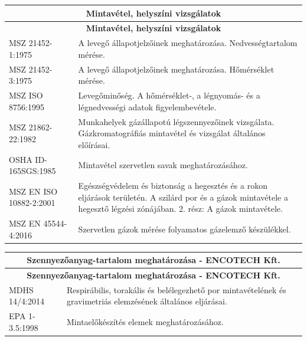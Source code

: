 \documentclass[a4paper,12pt]{article}
\renewcommand{\arraystretch}{0.5}
\begin{document}
		\renewcommand{\arraystretch}{1.1} %
		\footnotesize %

		\begin{longtable}{|p{5cm}|p{10cm}|}
			\hline
			\multicolumn{2}{|c|}{\textbf{Mintavétel, helyszíni vizsgálatok}} \\
			\hline
			\endfirsthead

			\multicolumn{2}{|c|}{\textbf{Mintavétel, helyszíni vizsgálatok}} \\
			\hline
			\endhead

			\endfoot

			\hline
			\endlastfoot

			MSZ 21452-1:1975 & A levegő állapotjelzőinek meghatározása. Nedvességtartalom mérése. \\ \hline MSZ 21452-3:1975 & A levegő állapotjelzőinek meghatározása. Hőmérséklet mérése. \\ \hline MSZ ISO 8756:1995 & Levegőminőség. A hőmérséklet-, a légnyomás- és a légnedvességi adatok figyelembevétele. \\ \hline MSZ 21862-22:1982 & Munkahelyek gázállapotú légszennyezőinek vizsgálata. Gázkromatográfiás mintavétel és vizsgálat általános előírásai. \\ \hline OSHA ID-165SGS:1985 & Mintavétel szervetlen savak meghatározásához. \\ \hline MSZ EN ISO 10882-2:2001 & Egészségvédelem és biztonság a hegesztés és a rokon eljárások területén. A szilárd por és a gázok mintavétele a hegesztő légzési zónájában. 2. rész: A gázok mintavétele. \\ \hline MSZ EN 45544-4:2016 & Szervetlen gázok mérése folyamatos gázelemző készülékkel. \\ \hline 

		\end{longtable}

		\begin{longtable}{|p{5cm}|p{10cm}|}
			\hline
			\multicolumn{2}{|c|}{\textbf{Szennyezőanyag-tartalom meghatározása - ENCOTECH Kft.}} \\
			\hline
			\endfirsthead

			\hline
			\multicolumn{2}{|c|}{\textbf{Szennyezőanyag-tartalom meghatározása - ENCOTECH Kft.}} \\
			\hline
			\endhead

			\endfoot

			\hline
			\endlastfoot

			MDHS 14/4:2014 & Respirábilis, torakális és belélegezhető por mintavételének és gravimetriás elemzésének általános eljárásai. \\ \hline EPA 1-3.5:1998 & Mintaelőkészítés elemek meghatározásához. \\ \hline 

		\end{longtable}
\end{document}
